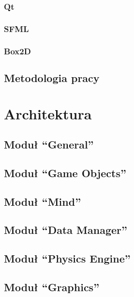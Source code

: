 \documentclass[licencjacka]{pracamgr}
\begin{document}
    \subsection{Qt}
    
    \subsection{SFML}
    
    \subsection{Box2D}

  \section{Metodologia pracy}
  
\chapter{Architektura}
  \section{Moduł ``General''}
  
  \section{Moduł ``Game Objects''}
  
  \section{Moduł ``Mind''}
  
  \section{Moduł ``Data Manager''}
  
  \section{Moduł ``Physics Engine''}
  
  \section{Moduł ``Graphics''}
\end{document}
